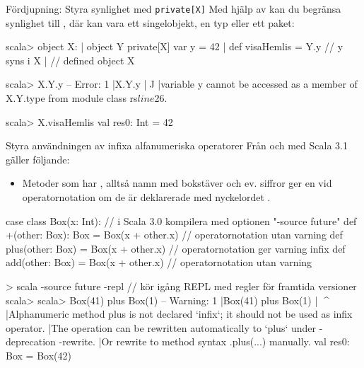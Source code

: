 \begin{Slide}{Fördjupning: Styra synlighet med \texttt{private[X]}}
Med hjälp av  kan du begränsa synlighet till , där  kan vara ett singelobjekt, en typ eller ett paket:
\begin{REPLsmall}
scala> object  X: 
     |   object Y { private[X] var y = 42 }
     |   def visaHemlis = Y.y  // y syns i X
     | 
// defined object X

scala> X.Y.y
-- Error:
1 |X.Y.y
  |^^^^^
  |variable y cannot be accessed as a member of X.Y.type from module class rs$line$26.

scala> X.visaHemlis
val res0: Int = 42

\end{REPLsmall}
\end{Slide}

\begin{Slide}{Styra användningen av infixa alfanumeriska operatorer}
Från och med Scala 3.1 gäller följande:
\begin{itemize}
\item Metoder som har , alltså namn med bokstäver och ev. siffror ger en  vid operatornotation om de  är deklarerade med nyckelordet .   
\end{itemize}
\pause
\begin{Code}
case class Box(x: Int): // i Scala 3.0 kompilera med optionen "-source future"
  def +(other: Box): Box = Box(x + other.x)    // operatornotation utan varning
  def plus(other: Box) = Box(x + other.x)      // operatornotation ger varning
  infix def add(other: Box) = Box(x + other.x) // operatornotation utan varning
\end{Code}
\begin{REPLsmall}
> scala -source future -repl // kör igång REPL med regler för framtida versioner
scala> scala> Box(41) plus Box(1)
-- Warning:
1 |Box(41) plus Box(1)
  |        ^^^^
  |Alphanumeric method plus is not declared `infix`; it should not be used as infix operator.
  |The operation can be rewritten automatically to `plus` under -deprecation -rewrite.
  |Or rewrite to method syntax .plus(...) manually.
val res0: Box = Box(42)
\end{REPLsmall}
\end{Slide}


